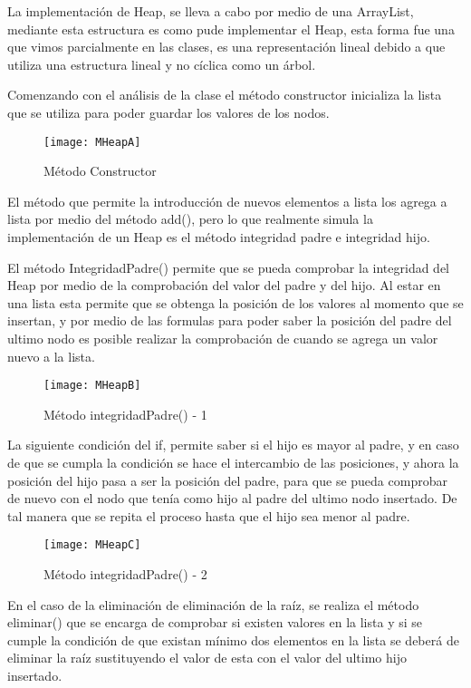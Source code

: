 \documentclass[12pt,a4paper]{article}
\begin{document}
	La implementación de Heap, se lleva a cabo por medio de una ArrayList, mediante esta estructura es como pude implementar el Heap, esta forma fue una que vimos parcialmente en las clases, es una representación lineal debido a que utiliza una estructura lineal y no cíclica como un árbol.
	 
	Comenzando con el análisis de la clase el método constructor inicializa la lista que se utiliza para poder guardar los valores de los nodos.

		\begin{figure}[h]
			\centering
			\texttt{[image: MHeapA]}
			\caption{Método Constructor}
		\end{figure}
		
	El método que permite la introducción de nuevos elementos a lista  los agrega a lista por medio del método add(), pero lo que realmente simula la implementación de un Heap es el método integridad padre e integridad hijo.

	El método IntegridadPadre() permite que se pueda comprobar la integridad del Heap por medio de la comprobación del valor del padre y del hijo. Al estar en una lista esta permite que se obtenga la posición de los valores al momento que se insertan, y por medio de las formulas para poder saber la posición del padre del ultimo nodo es posible realizar la comprobación de cuando se agrega un valor nuevo a la lista.

		\begin{figure}[h]
			\centering
			\texttt{[image: MHeapB]}
			\caption{Método integridadPadre() - 1}
		\end{figure}
	
	La siguiente condición del if, permite saber si el hijo es mayor al padre, y en caso de que se cumpla la condición se hace el intercambio de las posiciones, y ahora la posición del hijo pasa a ser la posición del padre, para que se pueda comprobar de nuevo con el nodo que tenía como hijo al padre del ultimo nodo insertado. De tal manera que se repita el proceso hasta que el hijo sea menor al padre.
	
		\begin{figure}[h]
			\centering
			\texttt{[image: MHeapC]}
			\caption{Método integridadPadre() - 2}
		\end{figure}
	
	En el caso de la eliminación de eliminación de la raíz, se realiza el método eliminar() que se encarga de comprobar si existen valores en la lista y si se cumple la condición de que existan mínimo dos elementos en la lista se deberá de eliminar la raíz sustituyendo el valor de esta con el valor del ultimo hijo insertado.
	
\end{document}
